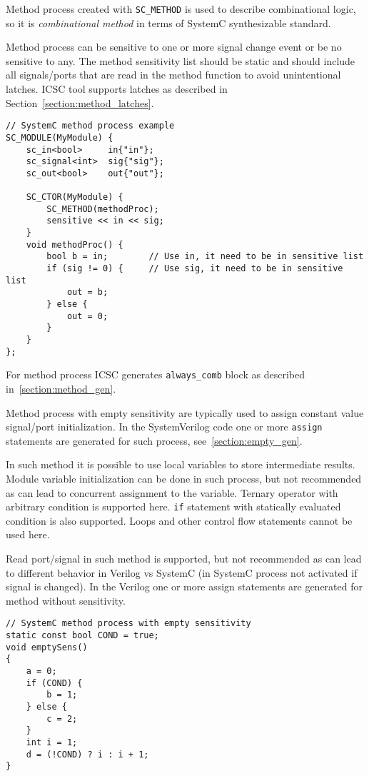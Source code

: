 Method process created with {\tt SC\_METHOD} is used to describe combinational logic, so it is \emph{combinational method} in terms of SystemC synthesizable standard. 

Method process can be sensitive to one or more signal change event or be no sensitive to any. The method sensitivity list should be static and should include all signals/ports that are read in the method function to avoid unintentional latches. ICSC tool supports latches as described in Section~\ref{section:method_latches}. 

\begin{lstlisting}[style=mycpp]
// SystemC method process example
SC_MODULE(MyModule) {
    sc_in<bool>     in{"in"};
    sc_signal<int>  sig{"sig"};
    sc_out<bool>    out{"out"};
    
    SC_CTOR(MyModule) {
        SC_METHOD(methodProc);
        sensitive << in << sig;
    }    
    void methodProc() {
    	bool b = in;        // Use in, it need to be in sensitive list
        if (sig != 0) {     // Use sig, it need to be in sensitive list
    	    out = b;
        } else {
            out = 0;
        }
    }
};
\end{lstlisting}
%
For method process ICSC generates {\tt always\_comb} block as described in~\ref{section:method_gen}.

Method process with empty sensitivity are typically used to assign constant value signal/port initialization. In the SystemVerilog code one or more {\tt assign} statements are generated for such process, see~\ref{section:empty_gen}. 

In such method it is possible to use local variables to store intermediate results. Module variable initialization can be done in such process, but not recommended as can lead to concurrent assignment to the variable. Ternary operator with arbitrary condition is supported here. {\tt if} statement with statically evaluated condition is also supported. Loops and other control flow statements cannot be used here.

Read port/signal in such method is supported, but not recommended as can lead to different behavior in Verilog vs SystemC (in SystemC process not activated if signal is changed). In the Verilog one or more assign statements are generated for method without sensitivity. 

\begin{lstlisting}[style=mycpp]
// SystemC method process with empty sensitivity
static const bool COND = true;
void emptySens()
{
    a = 0;
    if (COND) {
        b = 1;
    } else {
        c = 2;
    }
    int i = 1;
    d = (!COND) ? i : i + 1; 
}
\end{lstlisting}



